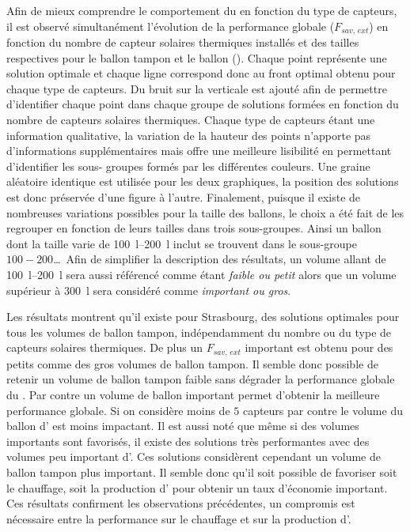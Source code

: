 Afin de mieux comprendre le comportement du  en fonction du type de capteurs, il
est observé simultanément l’évolution de la performance globale ($F_{sav,\, ext}$) en
fonction du nombre de capteur solaires thermiques installés et des tailles respectives
pour le ballon tampon et le ballon  ().
Chaque point représente une solution optimale et chaque ligne correspond donc au front
optimal obtenu pour chaque type de capteurs. Du bruit sur la verticale est ajouté afin de
permettre d’identifier chaque point dans chaque groupe de solutions formées en fonction du
nombre de capteurs solaires thermiques. Chaque type de capteurs étant une information
qualitative, la variation de la hauteur des points n’apporte pas d’informations
supplémentaires mais offre une meilleure lisibilité en permettant d’identifier les sous-
groupes formés par les différentes couleurs. Une graine aléatoire identique est utilisée
pour les deux graphiques, la position des solutions est donc préservée d’une figure à
l’autre. Finalement, puisque il existe de nombreuses variations possibles pour la taille
des ballons, le choix a été fait de les regrouper en fonction de leurs tailles dans trois
sous-groupes. Ainsi un ballon dont la taille varie de \SIrange{100}{200}{\litre} inclut se
trouvent dans le sous-groupe $100-200$\dots\ Afin de simplifier la description des résultats,
un volume allant de \SIrange{100}{200}{\litre} sera aussi référencé comme étant
\emph{faible ou petit} alors que un volume supérieur à \SI{300}{\litre} sera considéré
comme \emph{important ou gros}.

Les résultats montrent qu’il existe pour Strasbourg, des solutions optimales pour tous les volumes de
ballon tampon, indépendamment du nombre ou du type de capteurs solaires thermiques. De
plus un $F_{sav,\, ext}$ important est obtenu pour des petits comme des gros volumes de
ballon tampon. Il semble donc possible de retenir un volume de ballon tampon faible sans
dégrader la performance globale du . Par contre un volume de ballon 
important permet d’obtenir la meilleure performance globale. Si on considère moins de $5$
capteurs par contre le volume du ballon d’ est moins impactant. Il est aussi noté
que même si des volumes importants sont favorisés, il existe des solutions très
performantes avec des volumes peu important d’. Ces solutions considèrent
cependant un volume de ballon tampon plus important. Il semble donc qu’il soit possible de
favoriser soit le chauffage, soit la production d’ pour obtenir un taux
d’économie important. Ces résultats confirment les observations précédentes, un compromis
est nécessaire entre la performance sur le chauffage et sur la production d’.

